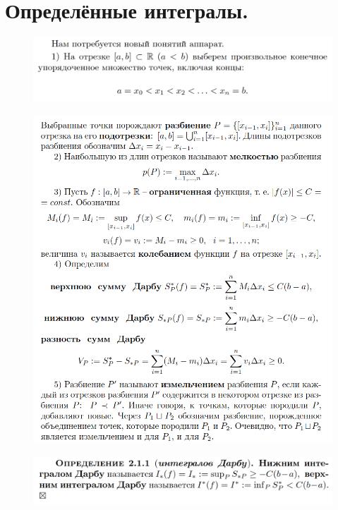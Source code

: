 \documentclass{article}
\begin{document}
\section{Определённые интегралы.}
\begin{figure}[h!]
    \centering
    \includegraphics[width=\textwidth]{52.png}
    \vspace{-1cm}
\end{figure}
\begin{figure}[h!]
    \centering
    \includegraphics[width=\textwidth]{53.png}
    \vspace{-1cm}
\end{figure}
\newpage
\begin{figure}[h!]
    \centering
    \includegraphics[width=\textwidth]{56.png}
    \vspace{-1cm}
\end{figure}
\end{document}
